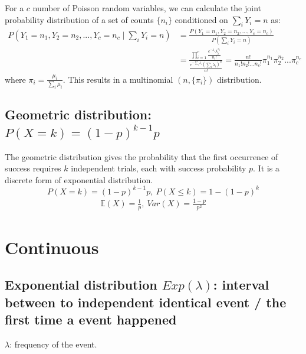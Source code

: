 \documentclass[11pt]{elegantbook}
\begin{document}
For a $c$ number of Poisson random variables, we can calculate the joint probability distribution of a set of counts $\{n_i\}$ conditioned on $\sum_i Y_i=n$ as:
\begin{equation}
    \begin{aligned}
        P(Y_1 = n_1,Y_2 = n_2,...,Y_c = n_c\mid \sum_i Y_i=n) &=\frac{P(Y_1 = n_1,Y_2 = n_2,...,Y_c = n_c)}{P(\sum_i Y_i=n)}\\
        &=\frac{\prod_{i=1}^c \frac{e^{-\lambda_i} \lambda_i^{n_i}}{n_i !}}{\frac{e^{-\sum_{i}\lambda_i} (\sum_i\lambda_i)^{n}}{n !}}=\frac{n!}{n_1!n_2!...n_c!}\pi_1^{n_1}\pi_2^{n_2}...\pi_c^{n_c}
    \end{aligned}
    \nonumber
\end{equation}
where $\pi_i=\frac{\mu_i}{\sum_i\mu_i}$. This results in a multinomial $(n,\{\pi_i\})$ distribution.

\subsection{Geometric distribution: $P(X=k)=(1-p)^{k-1}p$}
The geometric distribution gives the probability that the first occurrence of success requires $k$ independent trials, each with success probability $p$. It is a discrete form of exponential distribution.
$$P(X=k)=(1-p)^{k-1}p,\ P(X\leq k)=1-(1-p)^k$$
\begin{equation}
    \begin{aligned}
        \mathbb{E}(X)=\frac{1}{p},\ Var(X)=\frac{1-p}{p^2}
    \end{aligned}
    \nonumber
\end{equation}

\section{Continuous}
\subsection{Exponential distribution $Exp(\lambda)$: interval between to independent identical event / the first time a event happened}
$\lambda$: frequency of the event.
\end{document}
